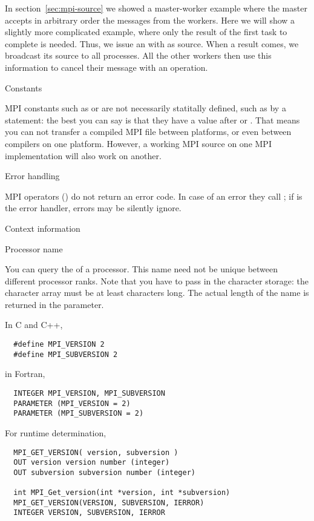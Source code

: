 In section~\ref{sec:mpi-source} we showed a master-worker example where the 
master accepts in arbitrary order the messages from the workers.
Here we will show a slightly
more complicated example, where only the result of the first task to
complete is needed. Thus, we issue an 
with  as source.  When a result comes, we
broadcast its source to all processes.  All the other workers then use
this information to cancel their message with
an  operation.


 {Constants}

MPI constants such as  or  are not
necessarily statitally defined, such as by a  statement:
the best you can say is that they have a value after
 or .
That means you can not transfer a compiled MPI file between
platforms, or even between compilers on one platform.
However, a working MPI source on one MPI implementation
will also work on another.

 {Error handling}
\label{sec:ref:mpi:error}

MPI operators () do not return an error code. In case of
an error they call ; if 
is the error handler, errors may be silently ignore.

 {Context information}
\label{sec:context}

 {Processor name}

You can query the  of a processor.
This name need not be unique between different processor ranks.
%
%
Note that you have to pass in the character storage:
the character array must be at least  characters long.
The actual length of the name is returned in the  parameter.

In C and C++,
\begin{verbatim}
  #define MPI_VERSION 2
  #define MPI_SUBVERSION 2
\end{verbatim}
in Fortran,
\begin{verbatim}
  INTEGER MPI_VERSION, MPI_SUBVERSION
  PARAMETER (MPI_VERSION = 2)
  PARAMETER (MPI_SUBVERSION = 2)
\end{verbatim}
For runtime determination,
\begin{verbatim}
  MPI_GET_VERSION( version, subversion )
  OUT version version number (integer)
  OUT subversion subversion number (integer)

  int MPI_Get_version(int *version, int *subversion)
  MPI_GET_VERSION(VERSION, SUBVERSION, IERROR)
  INTEGER VERSION, SUBVERSION, IERROR
\end{verbatim}

